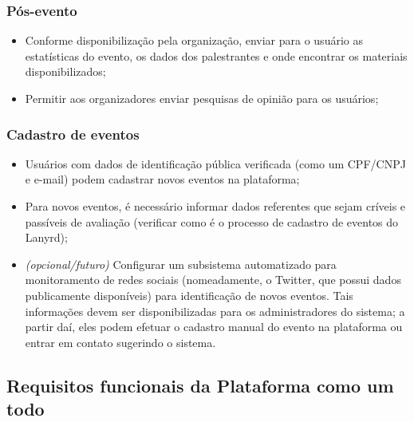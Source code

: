 \documentclass[12pt,a4paper,twoside,hyphens,english,brazil]{abntex2}
\begin{document}
\subsubsection*{Pós-evento}
\begin{itemize}
	\item Conforme disponibilização pela organização, enviar para o usuário as estatísticas do evento, os dados dos palestrantes e onde encontrar os materiais disponibilizados;
	\item Permitir aos organizadores enviar pesquisas de opinião para os usuários;
\end{itemize}

\subsubsection*{Cadastro de eventos}
\begin{itemize}
	\item Usuários com dados de identificação pública verificada (como um CPF/CNPJ e e-mail) podem cadastrar novos eventos na plataforma;
	\item Para novos eventos, é necessário informar dados referentes que sejam críveis e passíveis de avaliação (verificar como é o processo de cadastro de eventos do Lanyrd);
	\item \textit{(opcional/futuro)} Configurar um subsistema automatizado para monitoramento de redes sociais (nomeadamente, o Twitter, que possui dados publicamente disponíveis) para identificação de novos eventos. Tais informações devem ser disponibilizadas para os administradores do sistema; a partir daí, eles podem efetuar o cadastro manual do evento na plataforma ou entrar em contato sugerindo o sistema.
\end{itemize}

\subsection{Requisitos funcionais da Plataforma como um todo}
\end{document}

